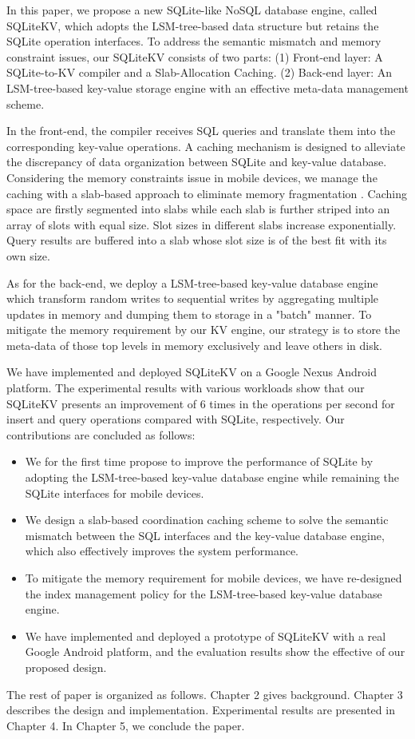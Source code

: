 In this paper, we propose a new SQLite-like NoSQL database engine, called SQLiteKV, which adopts the LSM-tree-based data structure but retains the SQLite operation interfaces. To address the semantic mismatch and memory constraint issues, our SQLiteKV consists of two parts: (1) Front-end layer: A SQLite-to-KV compiler and a Slab-Allocation Caching. (2) Back-end layer: An LSM-tree-based key-value storage engine with an effective meta-data management scheme. 

In the front-end, the compiler receives SQL queries and translate them into the corresponding key-value operations. A caching mechanism is designed to alleviate the discrepancy of data organization between SQLite and key-value database. Considering the memory constraints issue in mobile devices, we manage the caching with a slab-based approach to eliminate memory fragmentation \cite{ding2013integrated}. Caching space are firstly segmented into slabs while each slab is further striped into an array of slots with equal size. Slot sizes in different slabs increase exponentially. Query results are buffered into a slab whose slot size is of the best fit with its own size. 

As for the back-end, we deploy a LSM-tree-based key-value database engine which transform random writes to sequential writes by aggregating multiple updates in memory and dumping them to storage in a "batch" manner. To mitigate the memory requirement by our KV engine, our strategy is to store the meta-data of those top levels in memory exclusively and leave others in disk. 

We have implemented and deployed SQLiteKV on a Google Nexus Android platform. The experimental results with various workloads show that our SQLiteKV presents an improvement of 6 times in the operations per second for insert and query operations compared with SQLite, respectively. Our contributions are concluded as follows:

\begin{itemize}
	\item We for the first time propose to improve the performance of SQLite by adopting the LSM-tree-based key-value database engine while remaining the SQLite interfaces for mobile devices.
	\item We design a slab-based coordination caching scheme to solve the semantic mismatch between the SQL interfaces and the key-value database engine, which also effectively improves the system performance.
	\item To mitigate the memory requirement for mobile devices, we have re-designed the index management policy for the LSM-tree-based key-value database engine. 
	\item We have implemented and deployed a prototype of SQLiteKV with a real Google Android platform, and the evaluation results show the effective of our proposed design.
\end{itemize}

The rest of paper is organized as follows. Chapter 2 gives background. Chapter 3 describes the design and implementation. Experimental results are presented in Chapter 4. In Chapter 5, we conclude the paper.

